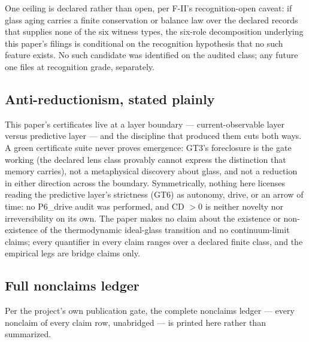 \documentclass[11pt]{article}
\theoremstyle{definition}
\begin{document}
One ceiling is declared rather than open, per F-II's recognition-open caveat: if glass aging
carries a finite conservation or balance law over the declared records that supplies none of the
six witness types, the six-role decomposition underlying this paper's filings is conditional on
the recognition hypothesis that no such feature exists. No such candidate was identified on the
audited class; any future one files at recognition grade, separately.

\subsection{Anti-reductionism, stated plainly}

This paper's certificates live at a layer boundary --- current-observable layer versus predictive
layer --- and the discipline that produced them cuts both ways. A green certificate suite never
proves emergence: GT3's foreclosure is the gate working (the declared lens class provably cannot
express the distinction that memory carries), not a metaphysical discovery about glass, and not a
reduction in either direction across the boundary. Symmetrically, nothing here licenses reading
the predictive layer's strictness (GT6) as autonomy, drive, or an arrow of time: no P6\_drive
audit was performed, and CD $> 0$ is neither novelty nor irreversibility on its own. The paper
makes no claim about the existence or non-existence of the thermodynamic ideal-glass transition
and no continuum-limit claims; every quantifier in every claim ranges over a declared finite
class, and the empirical legs are bridge claims only.

\subsection{Full nonclaims ledger}

Per the project's own publication gate, the complete nonclaims ledger --- every nonclaim of every
claim row, unabridged --- is printed here rather than summarized.
\end{document}
